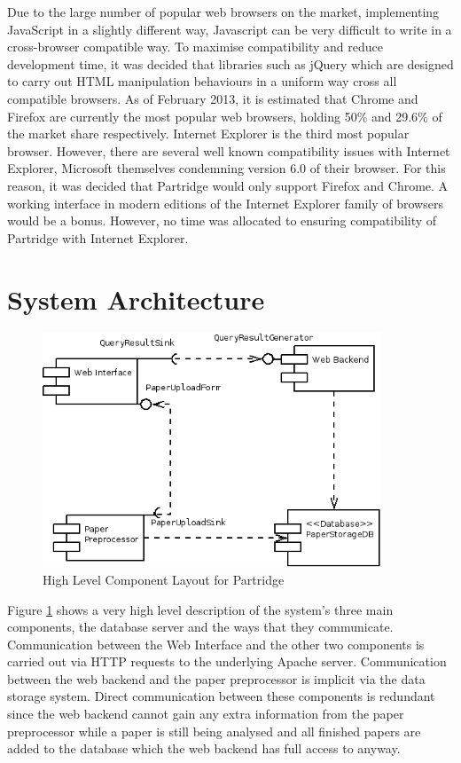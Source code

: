 Due to the large number of popular web browsers on the market, implementing
JavaScript in a slightly different way, Javascript can be very difficult to
write in a cross-browser compatible way.  To maximise compatibility and reduce
development time, it was decided that libraries such as jQuery which are
designed to carry out HTML manipulation behaviours in a uniform way cross all
compatible browsers.  As of February 2013, it is estimated that Chrome and
Firefox are currently the most popular web browsers, holding 50\% and 29.6\% of
the market share respectively\cite{browserstats2013}. Internet Explorer is the
third most popular browser. However, there are several well known compatibility
issues with Internet Explorer, Microsoft themselves condemning version 6.0 of
their browser\cite{ie6death}. For this reason, it was decided that Partridge
would only support Firefox and Chrome. A working interface in modern editions
of the Internet Explorer family of browsers would be a bonus.  However, no time
was allocated to ensuring compatibility of Partridge with Internet Explorer.

\section{ System Architecture }


\begin{figure}[!ht]
\center
\includegraphics[width=0.9\textwidth]{images/design/components_high_level.png}
\caption{High Level Component Layout for Partridge}
\label{fig:high_level_components}
\end{figure}

Figure \ref{fig:high_level_components} shows a very high level description of
the system's three main components, the database server and the ways that they
communicate. Communication between the Web Interface and the other two
components is carried out via HTTP requests to the underlying Apache server.
Communication between the web backend and the paper preprocessor is implicit
via the data storage system. Direct communication between these components is
redundant since the web backend cannot gain any extra information from the
paper preprocessor while a paper is still being analysed and all finished
papers are added to the database which the web backend has full access to
anyway.


